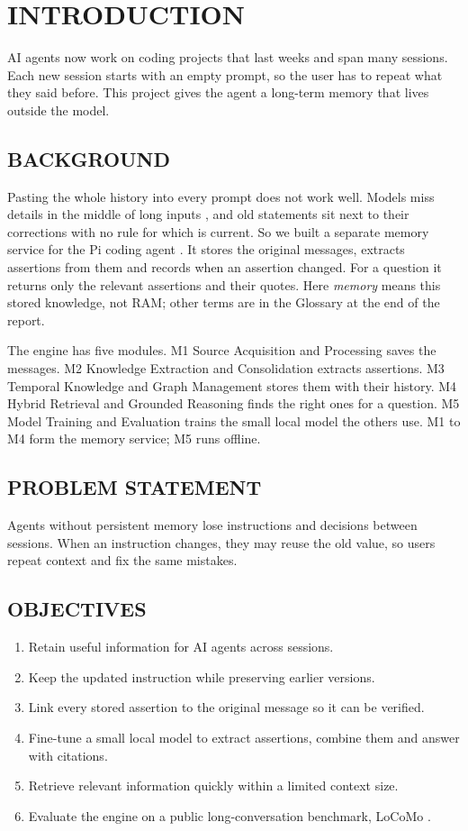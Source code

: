 
\chapter{\uppercase{Introduction}}
\label{ch:intro}
AI agents now work on coding projects that last weeks and span many sessions. Each new session
starts with an empty prompt, so the user has to repeat what they said before. This project
gives the agent a long-term memory that lives outside the model.

\section{\uppercase{Background}}
Pasting the whole history into every prompt does not work well. Models miss details in the
middle of long inputs \cite{liu2024lost}, and old statements sit next to their corrections with
no rule for which is current. So we built a separate memory service for the Pi coding agent
\cite{zechner2026pi}. It stores the original messages, extracts assertions from them and records
when an assertion changed. For a question it returns only the relevant assertions and their
quotes. Here \emph{memory} means this stored knowledge, not RAM; other terms are in the Glossary at the end of the report.

The engine has five modules. M1 Source Acquisition and Processing saves the messages. M2
Knowledge Extraction and Consolidation extracts assertions. M3 Temporal Knowledge and Graph
Management stores them with their history. M4 Hybrid Retrieval and Grounded Reasoning finds
the right ones for a question. M5 Model Training and Evaluation trains the small local model
the others use. M1 to M4 form the memory service; M5 runs offline.

\section{\uppercase{Problem Statement}}
Agents without persistent memory lose instructions and decisions between sessions. When an
instruction changes, they may reuse the old value, so users repeat context and fix the same
mistakes.

\section{\uppercase{Objectives}}
\begin{enumerate}[itemsep=0pt]
\item Retain useful information for AI agents across sessions.
\item Keep the updated instruction while preserving earlier versions.
\item Link every stored assertion to the original message so it can be verified.
\item Fine-tune a small local model to extract assertions, combine them and answer with citations.
\item Retrieve relevant information quickly within a limited context size.
\item Evaluate the engine on a public long-conversation benchmark, LoCoMo \cite{maharana2024locomo}.
\end{enumerate}

